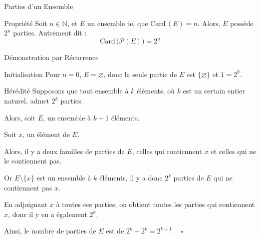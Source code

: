 \documentclass{coursbook}
\begin{document}
\begin{Gpartie}{Parties d'un Ensemble}
        \begin{Spartie}{Propriété}
            Soit $n\in\mathbb{N}$, et $E$ un ensemble tel que $\mathrm{Card}\,(E)=n$. Alors, $E$ possède $2^n$ parties. Autrement dit :
            \[\mathrm{Card}\,\big(\mathcal{P}(E)\big)=2^n\]
            \begin{SSpartie}{Démonstration par Récurrence}
                \begin{SSSpartie}{Initialisation}
                    Pour $n=0$, $E=\varnothing$, donc la seule partie de $E$ est $\big\{\varnothing\big\}$ et $1=2^0$.
                \end{SSSpartie}
                \begin{SSSpartie}{Hérédité}
                    Supposons que tout ensemble à $k$ éléments, où $k$ est un certain entier naturel, admet $2^k$ parties.

                    Alors, soit $E$, un ensemble à $k+1$ éléments.

                    Soit $x$, un élément de $E$.

                    Alors, il y a deux familles de parties de $E$, celles qui contiennent $x$ et celles qui ne le contiennent pas.

                    Or $E\setminus\big\{x\big\}$ est un ensemble à $k$ éléments, il y a donc $2^k$ parties de $E$ qui ne contiennent pas $x$.

                    En adjoignant $x$ à toutes ces parties, on obtient toutes les parties qui contiennent $x$, donc il y en a également $2^k$.
                    
                    Ainsi, le nombre de parties de $E$ est de $2^k+2^k=2^{k+1}$.$\quad\square$
                \end{SSSpartie}
            \end{SSpartie}
        \end{Spartie}
    \end{Gpartie}
\end{document}
